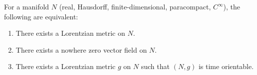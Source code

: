 For a manifold $N$ (real, Hausdorff, finite-dimensional, paracompact, $C^\infty$), the following are equivalent:
\begin{enumerate}
  \item There exists a Lorentzian metric on $N$.
  \item There exists a nowhere zero vector field on $N$.
  \item There exists a Lorentzian metric $g$ on $N$ such that $(N,g)$ is time orientable.
\end{enumerate}